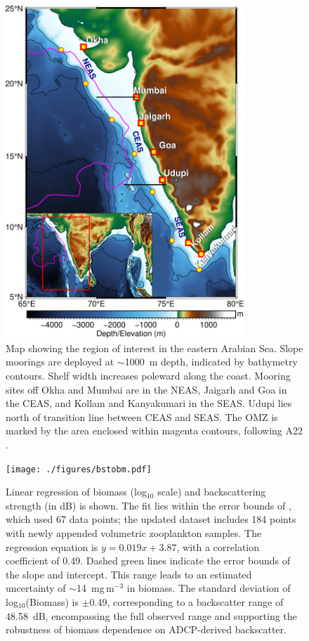 \documentclass[authoryear,review,11pt]{elsarticle}
\begin{document}
\newpage
\begin{figure}[htbp]
	\centering
	\includegraphics[width=0.8\textwidth]{./figures/map.pdf} 
	\captionsetup{justification=justified,font=footnotesize,skip=0.05\baselineskip,width=0.8\textwidth}
	\caption{Map showing the region of interest in the eastern Arabian Sea. Slope moorings are deployed at $\sim$1000~m depth, indicated by bathymetry contours. Shelf width increases poleward along the coast. Mooring sites off Okha and Mumbai are in the NEAS, Jaigarh and Goa in the CEAS, and Kollam and Kanyakumari in the SEAS. Udupi lies north of transition line between CEAS and SEAS. The OMZ is marked by the area enclosed within magenta contours, following A22 \citep{naqvi1990seasonal, smith2005mesozooplankton}.}
	\label{fig:map}
\end{figure}

\newpage
\begin{figure}[htbp]
	\centering
	\texttt{[image: ./figures/bstobm.pdf]} 
	\captionsetup{justification=justified,font=footnotesize,skip=0.05\baselineskip,width=0.8\textwidth}
	\caption{Linear regression of biomass (log$_{10}$ scale) and backscattering strength (in dB) is shown. The fit lies within the error bounds of \citet{aparna2022seasonal}, which used 67 data points; the updated dataset includes 184 points with newly appended volumetric zooplankton samples. The regression equation is $y = 0.019 x + 3.87$, with a correlation coefficient of 0.49. Dashed green lines indicate the error bounds of the slope and intercept. This range leads to an estimated uncertainty of $\sim$14~mg\,m$^{-3}$ in biomass. The standard deviation of log$_{10}$(Biomass) is $\pm$0.49, corresponding to a backscatter range of 48.58~dB, encompassing the full observed range and supporting the robustness of biomass dependence on ADCP-derived backscatter.}
	\label{fig:bstobm}
\end{figure}
\end{document}
